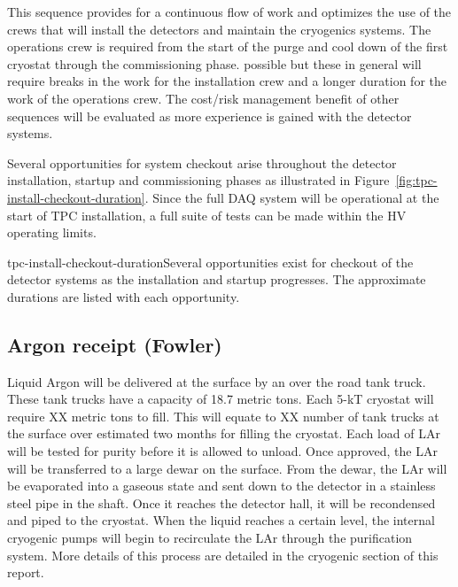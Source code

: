 This sequence provides for a continuous flow of work and optimizes the use of the crews that will install the detectors and maintain the cryogenics systems. The operations crew is required from the start of the purge and 
cool down of the first cryostat through the commissioning phase. possible but these in general will require breaks in the work for the installation crew and a longer duration for the work of the operations crew. The cost/risk 
management benefit of other sequences will be evaluated as more experience is gained with the detector systems. 

Several opportunities for system checkout arise throughout the detector installation, startup and commissioning phases as illustrated in Figure~\ref{fig:tpc-install-checkout-duration}. Since the full DAQ system will be operational at the start of TPC installation, a 
full suite of tests can be made within the HV operating limits. 


\begin{cdrfigure}{tpc-install-checkout-duration}{Several opportunities exist for checkout of the detector systems as the installation and startup progresses. The approximate durations are listed with each opportunity.}
\end{cdrfigure}


\subsection{Argon receipt (Fowler)}
\label{fd:install:Argon receipt (Fowler)}

Liquid Argon will be delivered at the surface by an over the road tank truck.  These tank trucks have a capacity of 18.7 metric tons.  Each 5-kT cryostat will require XX metric tons to fill.  This will equate to XX number of tank trucks at the surface over estimated two months for filling the cryostat.  Each load of LAr will be tested for purity before it is allowed to unload.  Once approved, the LAr will be transferred to a large dewar on the surface.  From the dewar, the LAr will be evaporated into a gaseous state and sent down to the detector in a stainless steel pipe in the shaft.  Once it reaches the detector hall, it will be recondensed and piped to the cryostat.  When the liquid reaches a certain level, the internal cryogenic pumps will begin to recirculate the LAr through the purification system.  More details of this process are detailed in the cryogenic section of this report.

